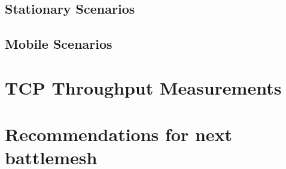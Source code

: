 \documentclass[a4paper,12pt,twoside]{article}
\begin{document}
\subsection{Stationary Scenarios}

\clearpage

\clearpage



\clearpage

\subsection{Mobile Scenarios}









\section{TCP Throughput Measurements}
\label{sec:tp-measurements}




\section{Recommendations for next battlemesh}
\end{document}
